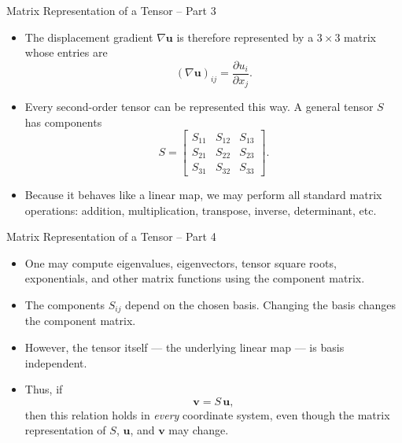 \documentclass[aspectratio=169,11pt]{beamer}
\begin{document}
\begin{frame}{Matrix Representation of a Tensor -- Part 3}

\begin{itemize}

\item The displacement gradient \(\nabla \mathbf{u}\) is therefore represented by
a \(3\times 3\) matrix whose entries are
\[
(\nabla \mathbf{u})_{ij} = \frac{\partial u_i}{\partial x_j}.
\]

\item Every second-order tensor can be represented this way.  
A general tensor \(S\) has components
\[
S =
\begin{bmatrix}
S_{11} & S_{12} & S_{13} \\
S_{21} & S_{22} & S_{23} \\
S_{31} & S_{32} & S_{33}
\end{bmatrix}.
\]

\item Because it behaves like a linear map, we may perform all standard
matrix operations: addition, multiplication, transpose, inverse, determinant, etc.

\end{itemize}

\end{frame}


\begin{frame}{Matrix Representation of a Tensor -- Part 4}

\begin{itemize}

\item One may compute eigenvalues, eigenvectors, tensor square roots, exponentials,
and other matrix functions using the component matrix.

\item The components \(S_{ij}\) depend on the chosen basis.  
Changing the basis changes the component matrix.

\item However, the tensor itself --- the underlying linear map --- is basis independent.

\item Thus, if
\[
\mathbf{v} = S\,\mathbf{u},
\]
then this relation holds in \emph{every} coordinate system, even though the
matrix representation of \(S\), \(\mathbf{u}\), and \(\mathbf{v}\) may change.

\end{itemize}

\end{frame}
\end{document}
